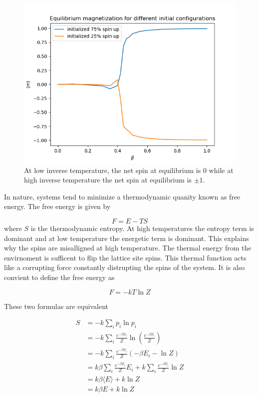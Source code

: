 \documentclass{article}
\begin{document}
\begin{figure}[ht]
    \includegraphics[width=\columnwidth]{plots/diff_spin_initializations.png}
    \caption{At low inverse temperature, the net spin at equilibrium is 0 while at high inverse temperature the net spin at equilibrium is $\pm 1$.}
    \label{fig:6}
\end{figure}

In nature, systems tend to minimize a thermodynamic quanity known as free energy. The free energy is given by

\begin{equation}\label{eq:eq1}
    F = E - TS
\end{equation}
where $S$ is the thermodynamic entropy. At high temperatures the entropy term is dominant and at low temperature the energetic term is dominant.
This explains why the spins are misalligned at high temperature. The thermal energy from the envirnoment is sufficent to flip the lattice site spins.
This thermal function acts like a corrupting force constantly distrupting the spins of the system. It is also convient to define the free energy as

\begin{equation}
    F = -kT \ln Z
\end{equation}

These two formulas are equivalent


\begin{align}
    S &= -k \sum_i p_i \ln p_i \\
    &= -k \sum_i \frac{e^{-\beta E_i}}{Z} \ln \left(\frac{e^{-\beta E_i}}{Z} \right) \\
    &= -k \sum_i \frac{e^{-\beta E_i}}{Z} (-\beta E_i - \ln Z) \\
    &= k \beta \sum_i \frac{e^{-\beta E_i}}{Z} E_i + k \sum_i \frac{e^{-\beta E_i}}{Z} \ln Z \\
    &= k \beta \langle E \rangle + k \ln Z \\
    &= k \beta E + k \ln Z
\end{align}
\end{document}

